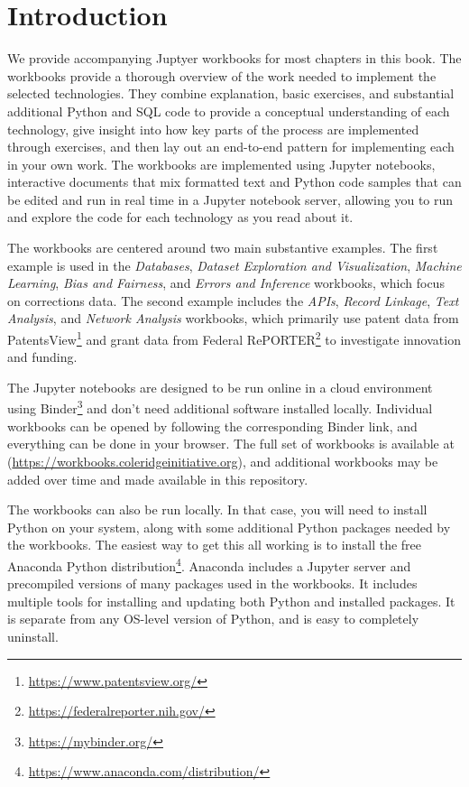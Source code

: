 \documentclass[]{krantz}
\begin{document}
\section{Introduction}\label{introduction-6}

We provide accompanying Juptyer workbooks for most chapters in this
book. The workbooks provide a thorough overview of the work needed to
implement the selected technologies. They combine explanation, basic
exercises, and substantial additional Python and SQL code to provide a
conceptual understanding of each technology, give insight into how key
parts of the process are implemented through exercises, and then lay out
an end-to-end pattern for implementing each in your own work. The
workbooks are implemented using Jupyter notebooks, interactive documents
that mix formatted text and Python code samples that can be edited and
run in real time in a Jupyter notebook server, allowing you to run and
explore the code for each technology as you read about it.

The workbooks are centered around two main substantive examples. The
first example is used in the \emph{Databases}, \emph{Dataset Exploration
and Visualization}, \emph{Machine Learning}, \emph{Bias and Fairness},
and \emph{Errors and Inference} workbooks, which focus on corrections
data. The second example includes the \emph{APIs}, \emph{Record
Linkage}, \emph{Text Analysis}, and \emph{Network Analysis} workbooks,
which primarily use patent data from PatentsView\footnote{\url{https://www.patentsview.org/}}
and grant data from Federal RePORTER\footnote{\url{https://federalreporter.nih.gov/}}
to investigate innovation and funding.

The Jupyter notebooks are designed to be run online in a cloud
environment using Binder\footnote{\url{https://mybinder.org/}} and don't
need additional software installed locally. Individual workbooks can be
opened by following the corresponding Binder link, and everything can be
done in your browser. The full set of workbooks is available at
(\url{https://workbooks.coleridgeinitiative.org}), and additional
workbooks may be added over time and made available in this repository.

The workbooks can also be run locally. In that case, you will need to
install Python on your system, along with some additional Python
packages needed by the workbooks. The easiest way to get this all
working is to install the free Anaconda Python distribution\footnote{\url{https://www.anaconda.com/distribution/}}.
Anaconda includes a Jupyter server and precompiled versions of many
packages used in the workbooks. It includes multiple tools for
installing and updating both Python and installed packages. It is
separate from any OS-level version of Python, and is easy to completely
uninstall.
\end{document}

